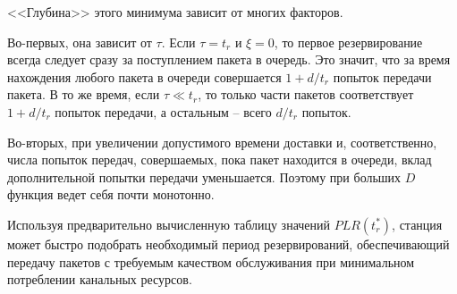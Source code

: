 <<Глубина>> этого минимума зависит от многих факторов.

Во-первых, она зависит от $\tau$. Если $\tau = t_r$ и  $\xi=0$, то первое резервирование всегда следует сразу за поступлением пакета в очередь. Это значит, что за время нахождения любого пакета в очереди совершается $1+d/t_r$ попыток передачи пакета. В то же время, если $\tau \ll t_r$, то только части пакетов соответствует $1+d/t_r$ попыток передачи, а остальным -- всего $d/t_r$ попыток.

Во-вторых, при увеличении допустимого времени доставки и, соответственно, числа попыток передач, совершаемых, пока пакет находится в очереди, вклад дополнительной попытки передачи уменьшается. Поэтому при больших $D$ функция ведет себя почти монотонно.

Используя предварительно вычисленную таблицу значений $PLR(t_r^*)$, станция может быстро подобрать необходимый период резервирований, обеспечивающий передачу пакетов с требуемым качеством обслуживания при минимальном потреблении канальных ресурсов.


